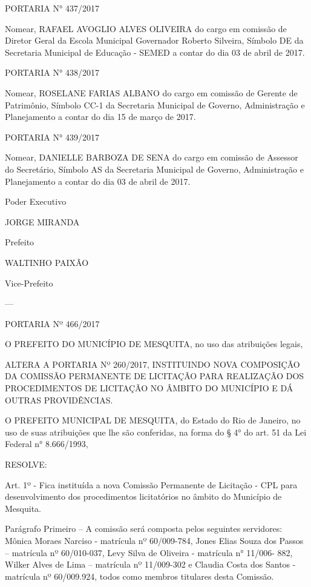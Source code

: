 \documentclass{doliberto}
\begin{document}
PORTARIA N° 437/2017 
 
Nomear, RAFAEL AVOGLIO ALVES OLIVEIRA do cargo em 
comissão  de  Diretor  Geral  da  Escola  Municipal 
Governador  Roberto  Silveira,  Símbolo  DE  da  Secretaria 
Municipal  de  Educação  -  SEMED  a  contar  do  dia  03  de 
abril de 2017. 
 
PORTARIA N° 438/2017 
 
Nomear,  ROSELANE  FARIAS  ALBANO  do  cargo  em 
comissão  de  Gerente  de  Patrimônio,  Símbolo  CC-1  da 
Secretaria  Municipal  de  Governo,  Administração  e 
Planejamento a contar do dia 15 de março de 2017. 
 
PORTARIA N° 439/2017 
 
Nomear,  DANIELLE  BARBOZA  DE  SENA  do  cargo  em 
comissão  de  Assessor  do  Secretário,  Símbolo  AS  da 
Secretaria  Municipal  de  Governo,  Administração  e 
Planejamento a contar do dia 03 de abril de 2017. 

Poder Executivo  

JORGE MIRANDA 

Prefeito 

WALTINHO PAIXÃO 

Vice-Prefeito 

---

PORTARIA Nº 466/2017 
 
 
O  PREFEITO  DO  MUNICÍPIO  DE  MESQUITA,  no  uso  das 
atribuições legais, 
  
ALTERA  A  PORTARIA  Nº  260/2017,  INSTITUINDO  NOVA 
COMPOSIÇÃO DA COMISSÃO PERMANENTE DE LICITAÇÃO 
PARA  REALIZAÇÃO  DOS  PROCEDIMENTOS  DE  LICITAÇÃO 
NO ÂMBITO DO MUNICÍPIO E DÁ OUTRAS PROVIDÊNCIAS. 
 
O  PREFEITO  MUNICIPAL  DE  MESQUITA,  do  Estado  do Rio 
de  Janeiro,  no  uso  de  suas  atribuições  que  lhe  são 
conferidas,  na  forma  do  §  4°  do  art.  51  da  Lei  Federal  n° 
8.666/1993, 
  
RESOLVE:  
 
Art.  1º  -  Fica  instituída  a  nova  Comissão  Permanente  de 
Licitação  -  CPL  para  desenvolvimento  dos  procedimentos 
licitatórios no âmbito do Município de Mesquita. 
  
Parágrafo  Primeiro  –  A  comissão  será  composta  pelos 
seguintes servidores: Mônica Moraes Narciso - matrícula nº 
60/009-784,  Jones  Elias  Souza  dos  Passos  –  matrícula  nº 
60/010-037, Levy  Silva  de  Oliveira  -  matrícula  n°  11/006-
882,  Wilker  Alves  de  Lima  –  matrícula  nº  11/009-302  e 
Claudia Costa dos Santos - matrícula nº 60/009.924, todos 
como membros titulares desta Comissão. 
 
\end{document}

